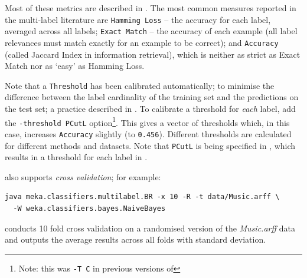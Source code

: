 \documentclass[11pt]{article}
\newcommand{\MEKA}{Meka}
\begin{document}
Most of these metrics are described in \cite{ECC2,MMD}. The most common measures reported in the multi-label literature are \texttt{Hamming Loss} -- the accuracy for each label, averaged across all labels; \texttt{Exact Match} -- the accuracy of each example (all label relevances must match exactly for an example to be correct); and \texttt{Accuracy} (called Jaccard Index in information retrieval), which is neither as strict as Exact Match nor as `easy' as Hamming Loss.


Note that a \texttt{Threshold} has been calibrated automatically; to minimise the difference between the label cardinality of the training set and the predictions on the test set; a practice described in \cite{ECC2}. To calibrate a threshold for \emph{each} label, add the \texttt{-threshold PCutL} option\footnote{Note: this was \texttt{-T C} in previous versions of \framework{\MEKA}}. This gives a vector of thresholds which, in this case, increases \texttt{Accuracy} slightly (to \texttt{0.456}). Different thresholds are calculated for different methods and datasets. Note that \texttt{PCutL} is being specified in , which results in a threshold for each label in .


\framework{\MEKA} also supports \emph{cross validation}; for example:
\begin{lstlisting}
java meka.classifiers.multilabel.BR -x 10 -R -t data/Music.arff \
  -W weka.classifiers.bayes.NaiveBayes
\end{lstlisting}
conducts 10 fold cross validation on a randomised version of the \textit{Music.arff} data and outputs the average results across all folds with standard deviation. %
\end{document}
